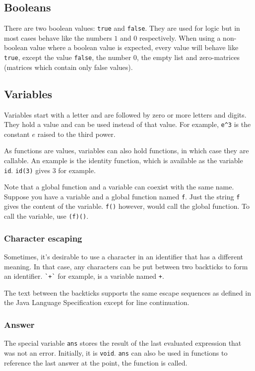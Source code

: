 \documentclass[10pt]{article}
\begin{document}
    \subsection{Booleans}\label{subsec:booleans}
    There are two boolean values: \verb|true| and \verb|false|.
    They are used for logic but in most cases behave like the numbers $ 1 $ and $ 0 $ respectively.
    When using a non-boolean value where a boolean value is expected, every value will behave like \verb|true|, except the value \verb|false|, the number $ 0 $, the empty list and zero-matrices (matrices  which contain only false values).
    
    \subsection{Variables}\label{subsec:variables}
    Variables start with a letter and are followed by zero or more letters and digits.
    They hold a value and can be used instead of that value.
    For example, \verb|e^3| is the constant $ e $ raised to the third power.
    
    As functions are values, variables can also hold functions, in which case they are callable.
    An example is the identity function, which is available as the variable \verb|id|.
    \verb|id(3)| gives $ 3 $ for example.
    
    Note that a global function and a variable can coexist with the same name.
    Suppose you have a variable and a global function named \verb|f|.
    Just the string \verb|f| gives the content of the variable.
    \verb|f()| however, would call the global function.
    To call the variable, use \verb|(f)()|.
    
    \subsubsection{Character escaping}
    Sometimes, it's desirable to use a character in an identifier that has a different meaning.
    In that case, any characters can be put between two backticks to form an identifier.
    \verb|`+`| for example, is a variable named \verb|+|.

    The text between the backticks supports the same escape sequences as defined in the Java Language Specification except for line continuation.
    
    \subsubsection{Answer}
    The special variable \verb|ans| stores the result of the last evaluated expression that was not an error.
    Initially, it is \verb|void|.
    \verb|ans| can also be used in functions to reference the last answer at the point, the function is called.
    
\end{document}
